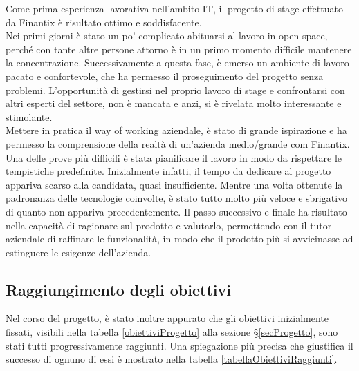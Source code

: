     Come prima esperienza lavorativa nell'ambito IT, il progetto di stage effettuato da Finantix è risultato ottimo e soddisfacente. \\
    Nei primi giorni è stato un po' complicato abituarsi al lavoro in open space, perché con tante altre persone attorno è in un primo momento difficile mantenere la concentrazione.
    Successivamente a questa fase, è emerso un ambiente di lavoro pacato e confortevole, che ha permesso il proseguimento del progetto senza problemi.
    L'opportunità di gestirsi nel proprio lavoro di stage e confrontarsi con altri esperti del settore, non è mancata e anzi, si è rivelata molto interessante e stimolante. \\
    Mettere in pratica il way of working aziendale, è stato di grande ispirazione e ha permesso la comprensione della realtà di un'azienda medio/grande com Finantix.
    Una delle prove più difficili è stata pianificare il lavoro in modo da rispettare le tempistiche predefinite.
    Inizialmente infatti, il tempo da dedicare al progetto appariva scarso alla candidata, quasi insufficiente.
    Mentre una volta ottenute la padronanza delle tecnologie coinvolte, è stato tutto molto più veloce e sbrigativo di quanto non appariva precedentemente.
    Il passo successivo e finale ha risultato nella capacità di ragionare sul prodotto e valutarlo, permettendo con il tutor aziendale di raffinare le funzionalità, in modo che il prodotto più si avvicinasse ad estinguere le esigenze dell'azienda.

    \subsection{Raggiungimento degli obiettivi}
    Nel corso del progetto, è stato inoltre appurato che gli obiettivi inizialmente fissati, visibili nella tabella \ref{obiettiviProgetto} alla sezione \S\ref{secProgetto}, sono stati tutti progressivamente raggiunti.
    Una spiegazione più precisa che giustifica il successo di ognuno di essi è mostrato nella tabella \ref{tabellaObiettiviRaggiunti}.

